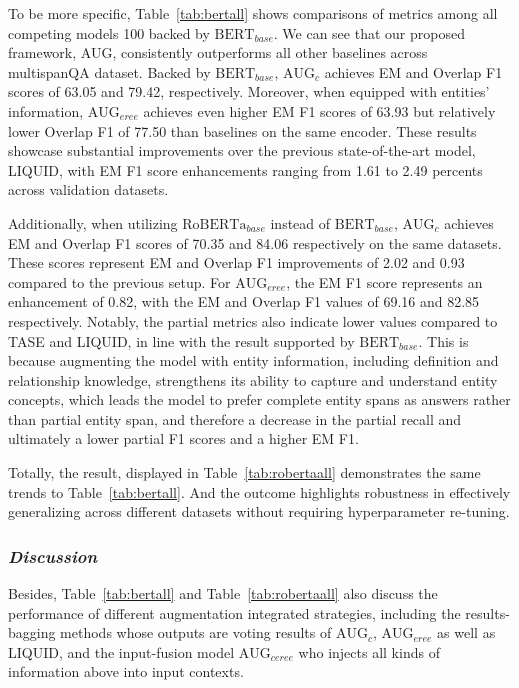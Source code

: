 \documentclass[mathematics,article,submit,moreauthors]{Definitions/mdpi}
\newcommand{\1}[1]{\mathds{1}\left[#1\right]}
\begin{document}
	To be more specific, Table~\ref{tab:bertall} shows comparisons of metrics among all competing models 100 backed by $\text{BERT}_{base}$. We can see that our proposed framework, AUG, consistently outperforms all other baselines across multispanQA dataset. Backed by $\text{BERT}_{base}$, $\text{AUG}_{c}$ achieves EM and Overlap F1 scores of 63.05 and 79.42, respectively. Moreover, when equipped with entities’ information,  $\text{AUG}_{eree}$ achieves even higher EM F1 scores of 63.93 but relatively lower Overlap F1 of 77.50 than baselines on the same encoder. These results showcase substantial improvements over the previous state-of-the-art model, LIQUID, with EM F1 score enhancements ranging from 1.61 to 2.49 percents across validation datasets. 
	
	Additionally, when utilizing $\text{RoBERTa}_{base}$ instead of $\text{BERT}_{base}$, $\text{AUG}_{c}$ achieves EM and Overlap F1 scores of 70.35 and 84.06 respectively on the same datasets. These scores represent EM and Overlap F1 improvements of 2.02 and 0.93 compared to the previous setup. For  $\text{AUG}_{eree}$, the EM F1 score represents an enhancement of 0.82, with the EM and Overlap F1 values of 69.16 and 82.85 respectively. Notably, the partial metrics also indicate lower values compared to TASE and LIQUID, in line with the result supported by $\text{BERT}_{base}$. This is because augmenting the model with entity information, including definition and relationship knowledge, strengthens its ability to capture and understand entity concepts, which leads the model to prefer complete entity spans as answers rather than partial entity span, and therefore a decrease in the partial recall and ultimately a lower partial F1 scores and a higher EM F1.
	
	Totally, the result, displayed in Table~\ref{tab:robertaall} demonstrates the same trends to Table~\ref{tab:bertall}. And the outcome highlights robustness in effectively generalizing across different datasets without requiring hyperparameter re-tuning. 
	
\subsubsection{\textit{Discussion}}
	Besides, Table~\ref{tab:bertall} and Table~\ref{tab:robertaall} also discuss the performance of different augmentation integrated strategies, including the results-bagging methods whose outputs are voting results of $\text{AUG}_{c}$, $\text{AUG}_{eree}$ as well as LIQUID, and the input-fusion model $\text{AUG}_{ceree}$ who injects all kinds of information above into input contexts.
	
\end{document}
